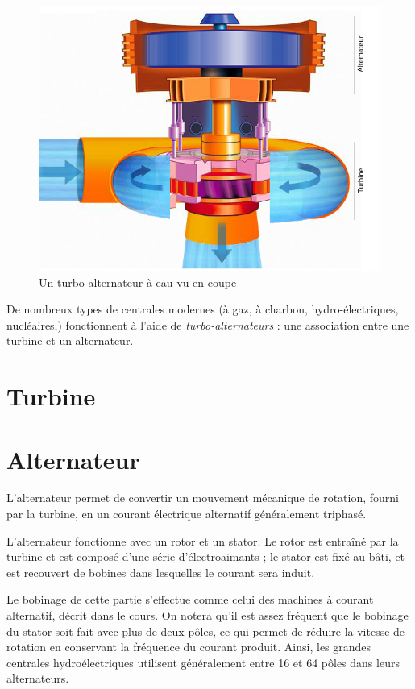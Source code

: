 \documentclass[12pt,a4paper,oneside,openany]{memoir}
\begin{document}
\begin{figure}
\centering
\includegraphics[width=0.9\linewidth]{coupe_turbo_alternateur}
\caption{Un turbo-alternateur à eau vu en coupe}
\label{fig:coupe_turbo_alternateur}
\end{figure}

De nombreux types de centrales modernes (à gaz, à charbon, hydro-électriques, nucléaires,\textellipsis) fonctionnent à l'aide de \emph{turbo-alternateurs} : une association entre une turbine et un alternateur.

\section{Turbine}

\section{Alternateur}
L'alternateur permet de convertir un mouvement mécanique de rotation, fourni par la turbine, en un courant électrique alternatif généralement triphasé.

L'alternateur fonctionne avec un rotor et un stator. Le rotor est entraîné par la turbine et est composé d'une série d'électroaimants ; le stator est fixé au bâti, et est recouvert de bobines dans lesquelles le courant sera induit.

Le bobinage de cette partie s'effectue comme celui des machines à courant alternatif, décrit dans le cours. On notera qu'il est assez fréquent que le bobinage du stator soit fait avec plus de deux pôles, ce qui permet de réduire la vitesse de rotation en conservant la fréquence du courant produit. Ainsi, les grandes centrales hydroélectriques utilisent généralement entre 16 et 64 pôles dans leurs alternateurs.
\end{document}
